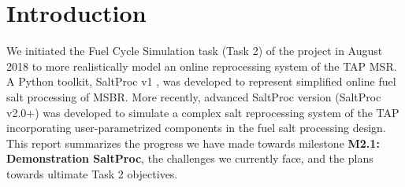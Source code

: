 \documentclass[12pt]{article} %
\begin{document}
\section{Introduction}
We initiated the Fuel Cycle Simulation task (Task 2) of the project in August 
2018 to more realistically model an online reprocessing system of the \gls{TAP} 
\gls{MSR}. A Python toolkit, SaltProc v1 \cite{rykhlevskii_modeling_2019,
rykhlevskii_advanced_2018, rykhlevskii_arfc/saltproc_2018}, was developed to 
represent simplified online fuel salt processing of \gls{MSBR}.
More recently, advanced SaltProc version (SaltProc v2.0+) was developed 
to simulate a complex salt reprocessing system of the \gls{TAP} incorporating 
user-parametrized components in the fuel salt processing design. This report 
summarizes the progress we have made towards milestone \textbf{M2.1: Demonstration 
SaltProc}, the challenges we currently face, and the plans towards ultimate 
Task 2 objectives.
\end{document}
